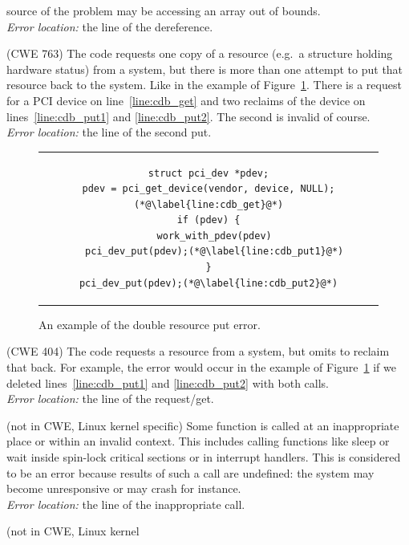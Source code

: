 \begin{description}
  source of the problem may be accessing an array out of bounds. \\
  \emph{Error location:} the line of the dereference.
\item[Double Resource Put] (CWE 763) The code requests one copy of a
  resource (e.g.\ a structure holding hardware status) from a system, but
  there is more than one attempt to put that resource back to the
  system. Like in the example of Figure~\ref{fig:cdb_double_res}. There is
  a request for a PCI device on line~\ref{line:cdb_get} and two reclaims
  of the device on lines~\ref{line:cdb_put1} and \ref{line:cdb_put2}. The
  second is invalid of course. \\
  \emph{Error location:} the line of the second put.
\begin{figure}[htb]
  \begin{center}
  \begin{tabular}{c}
  \begin{lstlisting}
struct pci_dev *pdev;
pdev = pci_get_device(vendor, device, NULL);(*@\label{line:cdb_get}@*)
if (pdev) {
  work_with_pdev(pdev)
  pci_dev_put(pdev);(*@\label{line:cdb_put1}@*)
}
pci_dev_put(pdev);(*@\label{line:cdb_put2}@*)
  \end{lstlisting}
  \end{tabular}
  \end{center}
    \caption{An example of the double resource put error.}
    \label{fig:cdb_double_res}
\end{figure}
\item[Resource Leak] (CWE 404) The code requests a resource from a
  system, but omits to reclaim that back. For example, the error would occur in
  the example of Figure~\ref{fig:cdb_double_res} if we deleted
  lines~\ref{line:cdb_put1} and \ref{line:cdb_put2} with both
   calls. \\
  \emph{Error location:} the line of the request/get.
\item[Calling Function from Invalid Context] (not in CWE, Linux
  kernel specific) Some function is called at an inappropriate place or within
  an invalid context. This includes calling functions like sleep or wait
  inside spin-lock critical sections or in interrupt handlers. This is
  considered to be an error because results of such a call are undefined: the
  system may become unresponsive or may crash for instance. \\
  \emph{Error location:} the line of the inappropriate call.
\item[Leaving Function in Locked State] (not in CWE, Linux kernel

\end{description}
